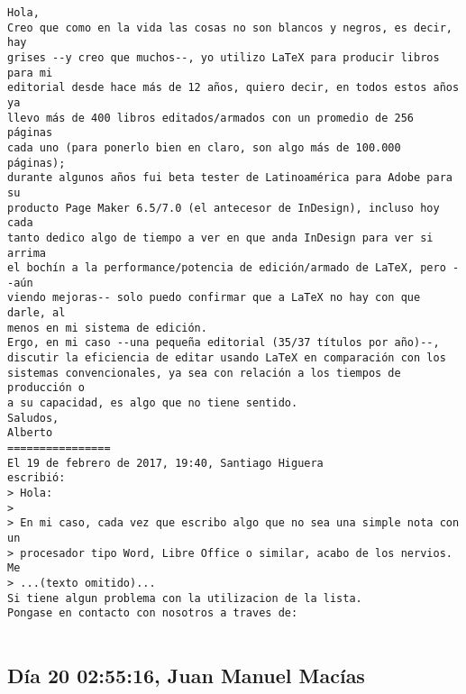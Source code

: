 \documentclass[a4paper,10pt]{article}
\begin{document}
\begin{lstlisting}
Hola,
Creo que como en la vida las cosas no son blancos y negros, es decir, hay
grises --y creo que muchos--, yo utilizo LaTeX para producir libros para mi
editorial desde hace más de 12 años, quiero decir, en todos estos años ya
llevo más de 400 libros editados/armados con un promedio de 256 páginas
cada uno (para ponerlo bien en claro, son algo más de 100.000 páginas);
durante algunos años fui beta tester de Latinoamérica para Adobe para su
producto Page Maker 6.5/7.0 (el antecesor de InDesign), incluso hoy cada
tanto dedico algo de tiempo a ver en que anda InDesign para ver si arrima
el bochín a la performance/potencia de edición/armado de LaTeX, pero --aún
viendo mejoras-- solo puedo confirmar que a LaTeX no hay con que darle, al
menos en mi sistema de edición.
Ergo, en mi caso --una pequeña editorial (35/37 títulos por año)--,
discutir la eficiencia de editar usando LaTeX en comparación con los
sistemas convencionales, ya sea con relación a los tiempos de producción o
a su capacidad, es algo que no tiene sentido.
Saludos,
Alberto
================
El 19 de febrero de 2017, 19:40, Santiago Higuera 
escribió:
> Hola:
>
> En mi caso, cada vez que escribo algo que no sea una simple nota con un
> procesador tipo Word, Libre Office o similar, acabo de los nervios. Me
> ...(texto omitido)...
Si tiene algun problema con la utilizacion de la lista.
Pongase en contacto con nosotros a traves de:


\end{lstlisting}

\subsection{Día 20 02:55:16, Juan Manuel Macías}
\end{document}
